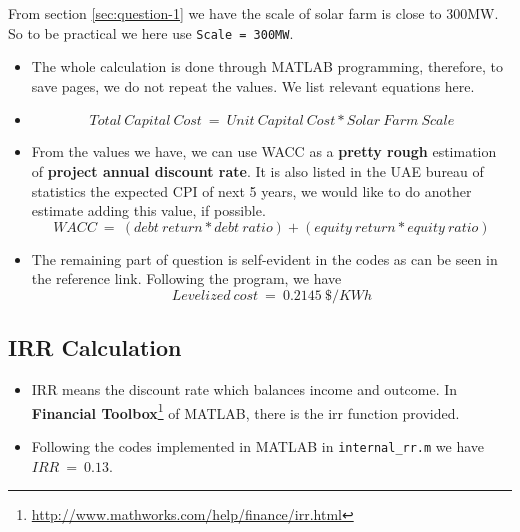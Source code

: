 \documentclass[12pt]{article}
\begin{document}
From section \ref{sec:question-1} we have the scale of solar farm is
close to 300MW. So to be practical we here use \texttt{Scale =
  300MW}.
\begin{itemize}
\item The whole calculation is done through MATLAB programming,
  therefore, to save pages, we do not repeat the values. We list
  relevant equations here.
\item
  \begin{equation}
    \label{eq:12}
    Total~Capital~Cost~=~Unit~Capital~Cost * Solar~Farm~Scale
  \end{equation}
\item From the values we have, we can use WACC as a \textbf{pretty
    rough} estimation of \textbf{project annual discount rate}. It is
  also listed in the UAE bureau of statistics the expected CPI of next
  5 years, we would like to do another estimate adding this value, if
  possible. 
  \begin{equation}
    \label{eq:13}
    WACC~=~(debt~return*debt~ratio)+(equity~return*equity~ratio)
  \end{equation}
\item The remaining part of question is self-evident in the codes as
  can be seen in the reference link. Following the program, we have
  \begin{equation}
    \label{eq:14}
    Levelized~cost~=~0.2145~\$/KWh
  \end{equation}

\end{itemize}

\subsection{IRR Calculation}
\label{sec:irr-calculation}

\begin{itemize}
\item IRR means the discount rate which balances income and
  outcome. In \textbf{Financial
    Toolbox}\footnote{\url{http://www.mathworks.com/help/finance/irr.html}}
  of MATLAB, there is the irr function provided.
\item Following the codes implemented in MATLAB in
  \texttt{internal\_rr.m} we have $IRR~=~0.13$.
\end{itemize}
\end{document}
